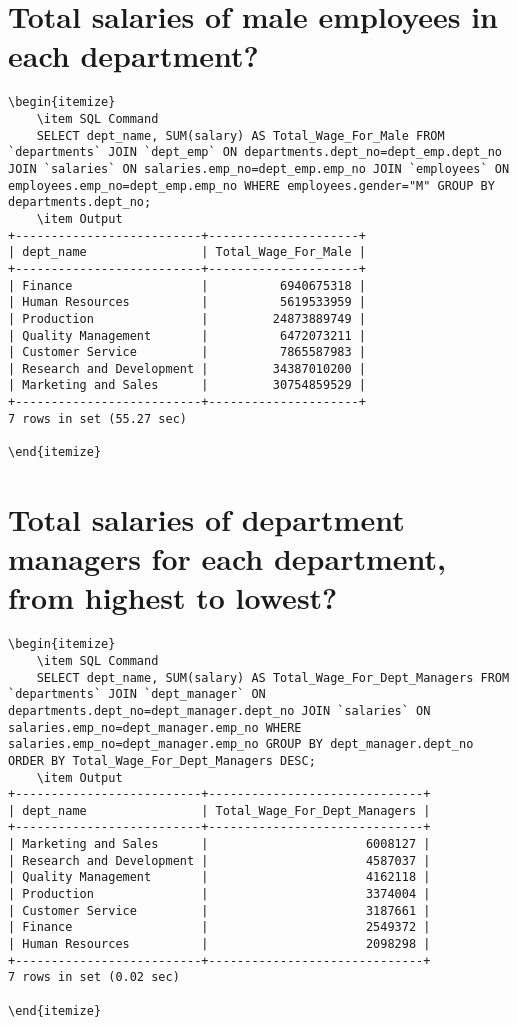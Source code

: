 \documentclass[13pt,a4paper]{report}
\begin{document}
\section{ Total salaries of male employees in each department? }
\begin{lstlisting}
\begin{itemize}
	\item SQL Command
	SELECT dept_name, SUM(salary) AS Total_Wage_For_Male FROM `departments` JOIN `dept_emp` ON departments.dept_no=dept_emp.dept_no JOIN `salaries` ON salaries.emp_no=dept_emp.emp_no JOIN `employees` ON employees.emp_no=dept_emp.emp_no WHERE employees.gender="M" GROUP BY departments.dept_no;
	\item Output
+--------------------------+---------------------+
| dept_name                | Total_Wage_For_Male |
+--------------------------+---------------------+
| Finance                  |          6940675318 |
| Human Resources          |          5619533959 |
| Production               |         24873889749 |
| Quality Management       |          6472073211 |
| Customer Service         |          7865587983 |
| Research and Development |         34387010200 |
| Marketing and Sales      |         30754859529 |
+--------------------------+---------------------+
7 rows in set (55.27 sec)

\end{itemize}
\end{lstlisting}

\section{ Total salaries of department managers for each department, from highest to lowest? }
\begin{lstlisting}
\begin{itemize}
	\item SQL Command
	SELECT dept_name, SUM(salary) AS Total_Wage_For_Dept_Managers FROM `departments` JOIN `dept_manager` ON departments.dept_no=dept_manager.dept_no JOIN `salaries` ON salaries.emp_no=dept_manager.emp_no WHERE salaries.emp_no=dept_manager.emp_no GROUP BY dept_manager.dept_no ORDER BY Total_Wage_For_Dept_Managers DESC;
	\item Output
+--------------------------+------------------------------+
| dept_name                | Total_Wage_For_Dept_Managers |
+--------------------------+------------------------------+
| Marketing and Sales      |                      6008127 |
| Research and Development |                      4587037 |
| Quality Management       |                      4162118 |
| Production               |                      3374004 |
| Customer Service         |                      3187661 |
| Finance                  |                      2549372 |
| Human Resources          |                      2098298 |
+--------------------------+------------------------------+
7 rows in set (0.02 sec)

\end{itemize}	
\end{lstlisting}
\end{document}
